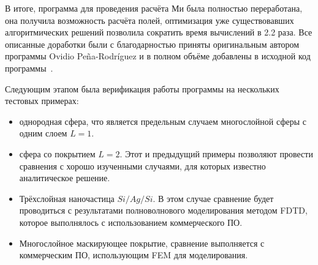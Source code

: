 В итоге, программа для проведения расчёта Ми была полностью
переработана, она получила возможность расчёта полей, оптимизация уже
существовавших алгоритмических решений позволила сократить время
вычислений в 2.2 раза.  Все описанные доработки были с благодарностью
приняты оригинальным автором программы Ovidio Pe\~{n}a-Rodr\'{i}guez и
в полном объёме добавлены в исходной код программы~\cite{Scattnlay-web}.


Следующим этапом была верификация работы программы на нескольких
тестовых примерах: 
\begin{itemize}
\item однородная сфера, что является предельным случаем многослойной
  сферы с одним слоем $L=1$.
\item сфера со покрытием $L=2$. Этот и предыдущий примеры позволяют
  провести сравнения с хорошо изученными случаями, для которых
  известно аналитическое решение.
\item Трёхслойная наночастица $Si/Ag/Si$. В этом случае сравнение
  будет проводиться с результатами полноволнового моделирования
  методом FDTD,  которое выполнялось с использованием  коммерческого ПО.
\item Многослойное маскирующее покрытие, сравнение выполняется с
  коммерческим ПО,  использующим FEM для моделирования.
\end{itemize}

